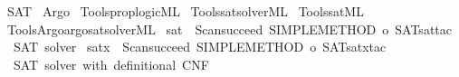 %
\begin{isabellebody}%
%
%
\isadelimdocument
%
\endisadelimdocument
%
\isatagdocument
%
\isamarkuptrue%
%
\endisatagdocument
{\isafolddocument}%
%
\isadelimdocument
%
\endisadelimdocument
%
\isadelimtheory
%
\endisadelimtheory
%
\isatagtheory
{}\isamarkupfalse%
\ SAT\isanewline
{}\ Argo\isanewline
{}%
\endisatagtheory
{\isafoldtheory}%
%
\isadelimtheory
\isanewline
%
\endisadelimtheory
%
\isadelimML
\isanewline
%
\endisadelimML
%
\isatagML
{}\isamarkupfalse%
\ {\isacartoucheopen}Tools{\isacharslash}{\kern0pt}prop{\isacharunderscore}{\kern0pt}logic{\isachardot}{\kern0pt}ML{\isacartoucheclose}\isanewline
{}\isamarkupfalse%
\ {\isacartoucheopen}Tools{\isacharslash}{\kern0pt}sat{\isacharunderscore}{\kern0pt}solver{\isachardot}{\kern0pt}ML{\isacartoucheclose}\isanewline
{}\isamarkupfalse%
\ {\isacartoucheopen}Tools{\isacharslash}{\kern0pt}sat{\isachardot}{\kern0pt}ML{\isacartoucheclose}\isanewline
{}\isamarkupfalse%
\ {\isacartoucheopen}Tools{\isacharslash}{\kern0pt}Argo{\isacharslash}{\kern0pt}argo{\isacharunderscore}{\kern0pt}sat{\isacharunderscore}{\kern0pt}solver{\isachardot}{\kern0pt}ML{\isacartoucheclose}\isanewline
\isanewline
{}\isamarkupfalse%
\ sat\ {\isacharequal}{\kern0pt}\ {\isacartoucheopen}Scan{\isachardot}{\kern0pt}succeed\ {\isacharparenleft}{\kern0pt}SIMPLE{\isacharunderscore}{\kern0pt}METHOD{\isacharprime}{\kern0pt}\ o\ SAT{\isachardot}{\kern0pt}sat{\isacharunderscore}{\kern0pt}tac{\isacharparenright}{\kern0pt}{\isacartoucheclose}\isanewline
\ \ {\isachardoublequoteopen}SAT\ solver{\isachardoublequoteclose}\isanewline
\isanewline
{}\isamarkupfalse%
\ satx\ {\isacharequal}{\kern0pt}\ {\isacartoucheopen}Scan{\isachardot}{\kern0pt}succeed\ {\isacharparenleft}{\kern0pt}SIMPLE{\isacharunderscore}{\kern0pt}METHOD{\isacharprime}{\kern0pt}\ o\ SAT{\isachardot}{\kern0pt}satx{\isacharunderscore}{\kern0pt}tac{\isacharparenright}{\kern0pt}{\isacartoucheclose}\isanewline
\ \ {\isachardoublequoteopen}SAT\ solver\ {\isacharparenleft}{\kern0pt}with\ definitional\ CNF{\isacharparenright}{\kern0pt}{\isachardoublequoteclose}%
\endisatagML
{\isafoldML}%
%
\isadelimML
\isanewline
%
\endisadelimML
%
\isadelimtheory
\isanewline
%
\endisadelimtheory
%
\isatagtheory
{}\isamarkupfalse%
%
\endisatagtheory
{\isafoldtheory}%
%
\isadelimtheory
%
\endisadelimtheory
%
\end{isabellebody}%
\endinput
